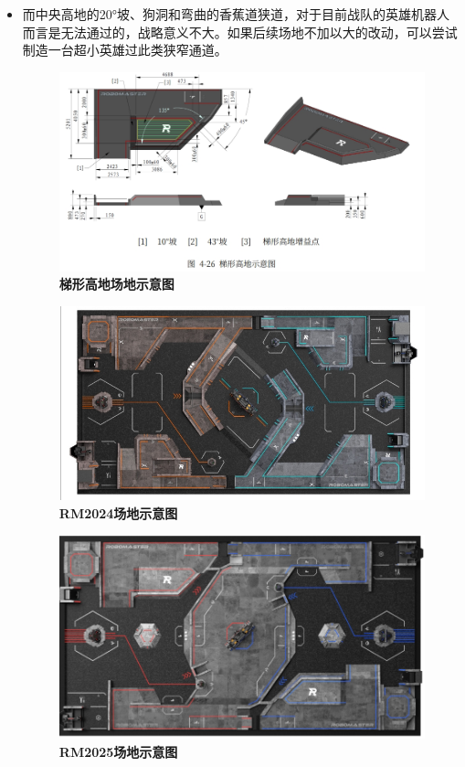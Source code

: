 \begin{itemize}
                \item 而中央高地的20°坡、狗洞和弯曲的香蕉道狭道，对于目前战队的英雄机器人而言是无法通过的，战略意义不大。如果后续场地不加以大的改动，可以尝试制造一台超小英雄过此类狭窄通道。
    
                \begin{figure}[H]
                    \centering
                    \includegraphics[height=0.35\textwidth]{figure/trapezoidalElevation.png}
                    \hspace{0.5em}
                    \caption{\textbf{\textbf{梯形高地场地示意图}}}
                    \label{fig:trapezoidalElevation}
                \end{figure}

                \newpage

                \begin{figure}[H]
                    \centering
                    \includegraphics[height=0.35\textwidth]{figure/RM2024_map.png}
                    \hspace{0.5em}
                    \caption{\textbf{\textbf{RM2024场地示意图}}}
                    \label{fig:RM2024_map}
                \end{figure}
                
                \begin{figure}[H]
                    \centering
                    \includegraphics[height=0.35\textwidth]{figure/RM2025_map.png}
                    \hspace{0.5em}
                    \caption{\textbf{\textbf{RM2025场地示意图}}}
                    \label{fig:RM2025_map}
                \end{figure}
    

\end{itemize}
